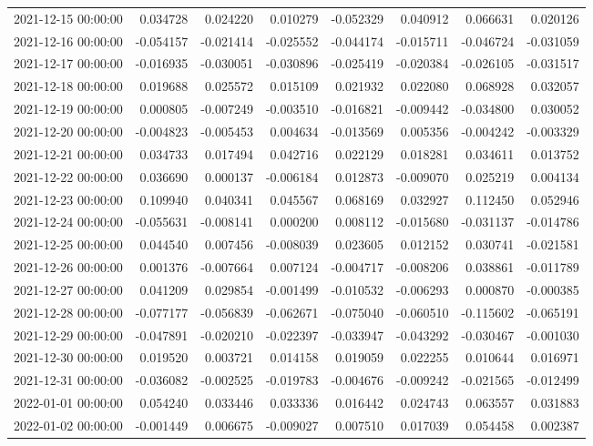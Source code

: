 \begin{tabular}{lrrrrrrr}
2021-12-15 00:00:00 & 0.034728 & 0.024220 & 0.010279 & -0.052329 & 0.040912 & 0.066631 & 0.020126 \\
2021-12-16 00:00:00 & -0.054157 & -0.021414 & -0.025552 & -0.044174 & -0.015711 & -0.046724 & -0.031059 \\
2021-12-17 00:00:00 & -0.016935 & -0.030051 & -0.030896 & -0.025419 & -0.020384 & -0.026105 & -0.031517 \\
2021-12-18 00:00:00 & 0.019688 & 0.025572 & 0.015109 & 0.021932 & 0.022080 & 0.068928 & 0.032057 \\
2021-12-19 00:00:00 & 0.000805 & -0.007249 & -0.003510 & -0.016821 & -0.009442 & -0.034800 & 0.030052 \\
2021-12-20 00:00:00 & -0.004823 & -0.005453 & 0.004634 & -0.013569 & 0.005356 & -0.004242 & -0.003329 \\
2021-12-21 00:00:00 & 0.034733 & 0.017494 & 0.042716 & 0.022129 & 0.018281 & 0.034611 & 0.013752 \\
2021-12-22 00:00:00 & 0.036690 & 0.000137 & -0.006184 & 0.012873 & -0.009070 & 0.025219 & 0.004134 \\
2021-12-23 00:00:00 & 0.109940 & 0.040341 & 0.045567 & 0.068169 & 0.032927 & 0.112450 & 0.052946 \\
2021-12-24 00:00:00 & -0.055631 & -0.008141 & 0.000200 & 0.008112 & -0.015680 & -0.031137 & -0.014786 \\
2021-12-25 00:00:00 & 0.044540 & 0.007456 & -0.008039 & 0.023605 & 0.012152 & 0.030741 & -0.021581 \\
2021-12-26 00:00:00 & 0.001376 & -0.007664 & 0.007124 & -0.004717 & -0.008206 & 0.038861 & -0.011789 \\
2021-12-27 00:00:00 & 0.041209 & 0.029854 & -0.001499 & -0.010532 & -0.006293 & 0.000870 & -0.000385 \\
2021-12-28 00:00:00 & -0.077177 & -0.056839 & -0.062671 & -0.075040 & -0.060510 & -0.115602 & -0.065191 \\
2021-12-29 00:00:00 & -0.047891 & -0.020210 & -0.022397 & -0.033947 & -0.043292 & -0.030467 & -0.001030 \\
2021-12-30 00:00:00 & 0.019520 & 0.003721 & 0.014158 & 0.019059 & 0.022255 & 0.010644 & 0.016971 \\
2021-12-31 00:00:00 & -0.036082 & -0.002525 & -0.019783 & -0.004676 & -0.009242 & -0.021565 & -0.012499 \\
2022-01-01 00:00:00 & 0.054240 & 0.033446 & 0.033336 & 0.016442 & 0.024743 & 0.063557 & 0.031883 \\
2022-01-02 00:00:00 & -0.001449 & 0.006675 & -0.009027 & 0.007510 & 0.017039 & 0.054458 & 0.002387 \\

\end{tabular}
